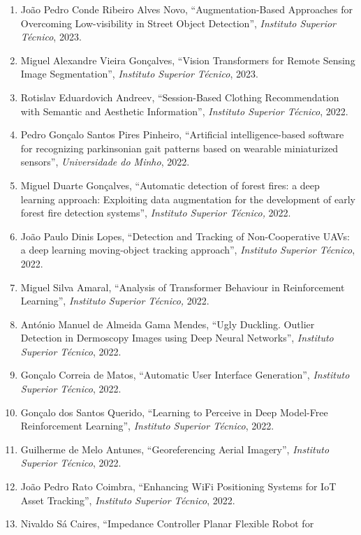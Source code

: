 \begin{enumerate}
\def\labelenumi{\arabic{enumi}.}
\item
  João Pedro Conde Ribeiro Alves Novo, ``Augmentation-Based Approaches
  for Overcoming Low-visibility in Street Object Detection'',
  \emph{Instituto Superior Técnico}, 2023.
\item
  Miguel Alexandre Vieira Gonçalves, ``Vision Transformers for Remote
  Sensing Image Segmentation'', \emph{Instituto Superior Técnico}, 2023.
\item
  Rotislav Eduardovich Andreev, ``Session-Based Clothing Recommendation
  with Semantic and Aesthetic Information'', \emph{Instituto Superior
  Técnico}, 2022.
\item
  Pedro Gonçalo Santos Pires Pinheiro, ``Artificial intelligence-based
  software for recognizing parkinsonian gait patterns based on wearable
  miniaturized sensors'', \emph{Universidade do Minho}, 2022.
\item
  Miguel Duarte Gonçalves, ``Automatic detection of forest fires: a deep
  learning approach: Exploiting data augmentation for the development of
  early forest fire detection systems'', \emph{Instituto Superior
  Técnico,} 2022.
\item
  João Paulo Dinis Lopes, ``Detection and Tracking of Non-Cooperative
  UAVs: a deep learning moving-object tracking approach'',
  \emph{Instituto Superior Técnico}, 2022.
\item
  Miguel Silva Amaral, ``Analysis of Transformer Behaviour in
  Reinforcement Learning'', \emph{Instituto Superior Técnico,} 2022.
\item
  António Manuel de Almeida Gama Mendes, ``Ugly Duckling. Outlier
  Detection in Dermoscopy Images using Deep Neural Networks'',
  \emph{Instituto Superior Técnico}, 2022.
\item
  Gonçalo Correia de Matos, ``Automatic User Interface Generation'',
  \emph{Instituto Superior Técnico}, 2022.
\item
  Gonçalo dos Santos Querido, ``Learning to Perceive in Deep Model-Free
  Reinforcement Learning'', \emph{Instituto Superior Técnico}, 2022.
\item
  Guilherme de Melo Antunes, ``Georeferencing Aerial Imagery'',
  \emph{Instituto Superior Técnico}, 2022.
\item
  João Pedro Rato Coimbra, ``Enhancing WiFi Positioning Systems for IoT
  Asset Tracking'', \emph{Instituto Superior Técnico}, 2022.
\item
  Nivaldo Sá Caires, ``Impedance Controller Planar Flexible Robot for

\end{enumerate}

